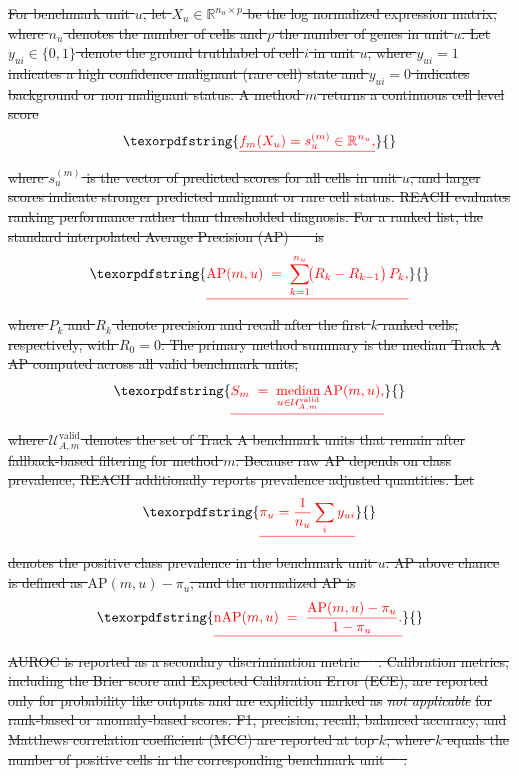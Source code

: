 \documentclass[10pt]{article}
\providecommand{\DIFdeltex}[1]{{\protect\color{red}\sout{#1}}}                      %
\providecommand{\DIFdel}[1]{\texorpdfstring{\DIFdeltex{#1}}{}} %
\begin{document}
\begin{enumerate}
\DIFdel{For benchmark unit $u$, let $X_u\in\mathbb{R}^{n_u\times p}$ be the
log normalized expression matrix, where
$n_u$ denotes the number of cells and $p$ the number of genes in unit $u$.
Let $y_{ui}\in\{0,1\}$ denote the ground truthlabel of cell $i$ in unit
$u$, where $y_{ui}=1$ indicates a high confidence malignant (rare cell)
state and $y_{ui}=0$ indicates background or non malignant status.
A method $m$ returns a continuous cell level score
}\begin{displaymath}
  \DIFdel{f_m(X_u) = s_u^{(m)} \in \mathbb{R}^{n_u},
}\end{displaymath}%
\DIFdel{where $s_u^{(m)}$ is the vector of predicted scores for all cells in unit
$u$, and larger scores indicate stronger predicted malignant or rare cell
status. REACH evaluates ranking performance rather than thresholded
diagnosis.
For a ranked list, the standard interpolated Average Precision
(AP)~\mbox{%
\cite{davis2006relationship,cormack2006statistical} }\hskip0pt%
is
}\begin{displaymath}
  \DIFdel{\mathrm{AP}(m,u) \;=\; \sum_{k=1}^{n_u}\!\bigl(R_k - R_{k-1}\bigr)\,P_k,
}\end{displaymath}%
\DIFdel{where $P_k$ and $R_k$ denote precision and recall after the first $k$
ranked cells, respectively, with $R_0 = 0$.
The primary method summary is the median Track A AP
computed across all valid benchmark units,
}\begin{displaymath}
  \DIFdel{S_m \;=\;
  \mathop{\mathrm{median}}_{u\in\mathcal{U}_{A,m}^{\mathrm{valid}}}
  \mathrm{AP}(m,u),
}\end{displaymath}%
\DIFdel{where $\mathcal{U}_{A,m}^{\mathrm{valid}}$ denotes the set of Track A
benchmark units that remain after fallback-based filtering for method $m$.
Because raw AP depends on class prevalence, REACH additionally reports
prevalence adjusted quantities. Let
}\begin{displaymath}
  \DIFdel{\pi_u = \frac{1}{n_u}\sum_i y_{ui}
}\end{displaymath}%
\DIFdel{denotes the positive class prevalence in the benchmark unit $u$. AP above
chance is defined as $\mathrm{AP}(m,u)-\pi_u$, and the normalized AP is
}\begin{displaymath}
  \DIFdel{\mathrm{nAP}(m,u)
  \;=\;
  \frac{\mathrm{AP}(m,u)-\pi_u}{1-\pi_u}.
}\end{displaymath}%
\DIFdel{AUROC is reported as a secondary discrimination
metric~\mbox{%
\cite{davis2006relationship,saito2015precision}}\hskip0pt%
. Calibration
metrics, including the Brier score and Expected Calibration Error (ECE),
are reported only for probability like outputs and are explicitly marked
as }\emph{\DIFdel{not applicable}} %
\DIFdel{for rank-based or anomaly-based scores. F1, precision, recall, balanced accuracy, and Matthews correlation coefficient
(MCC) are reported at top $k$, where $k$ equals the number of positive
cells in the corresponding benchmark
unit~\mbox{%
\cite{johnson2019survey,altalhan2025imbalanced}}\hskip0pt%
.
}%


\end{enumerate}
\end{document}
